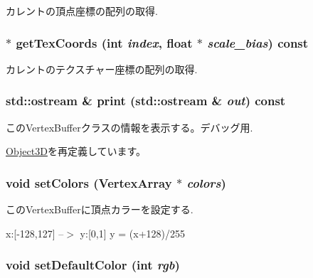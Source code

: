 カレントの頂点座標の配列の取得. \hypertarget{classm3g_1_1VertexBuffer_9015840c09da0691c31a8aab5e09404a}{
\subsubsection[{getTexCoords}]{ $\ast$ getTexCoords (int {\em index}, \/  float $\ast$ {\em scale\_\-bias}) const}}
\label{classm3g_1_1VertexBuffer_9015840c09da0691c31a8aab5e09404a}


カレントのテクスチャー座標の配列の取得. \hypertarget{classm3g_1_1VertexBuffer_6fea17fa1532df3794f8cb39cb4f911f}{
\subsubsection[{print}]{\setlength{\rightskip}{0pt plus 5cm}std::ostream \& print (std::ostream \& {\em out}) const}}
\label{classm3g_1_1VertexBuffer_6fea17fa1532df3794f8cb39cb4f911f}


このVertexBufferクラスの情報を表示する。デバッグ用. 

\hyperlink{classm3g_1_1Object3D_6fea17fa1532df3794f8cb39cb4f911f}{Object3D}を再定義しています。\hypertarget{classm3g_1_1VertexBuffer_e5a5933252e3ec3afa0a83698b5b3521}{
\subsubsection[{setColors}]{\setlength{\rightskip}{0pt plus 5cm}void setColors ({\bf VertexArray} $\ast$ {\em colors})}}
\label{classm3g_1_1VertexBuffer_e5a5933252e3ec3afa0a83698b5b3521}


このVertexBufferに頂点カラーを設定する.

x:\mbox{[}-128,127\mbox{]} --$>$ y:\mbox{[}0,1\mbox{]} y = (x+128)/255 \hypertarget{classm3g_1_1VertexBuffer_ba88996ea63221b09b9f841aef0270ee}{
\subsubsection[{setDefaultColor}]{\setlength{\rightskip}{0pt plus 5cm}void setDefaultColor (int {\em rgb})}}
\label{classm3g_1_1VertexBuffer_ba88996ea63221b09b9f841aef0270ee}



